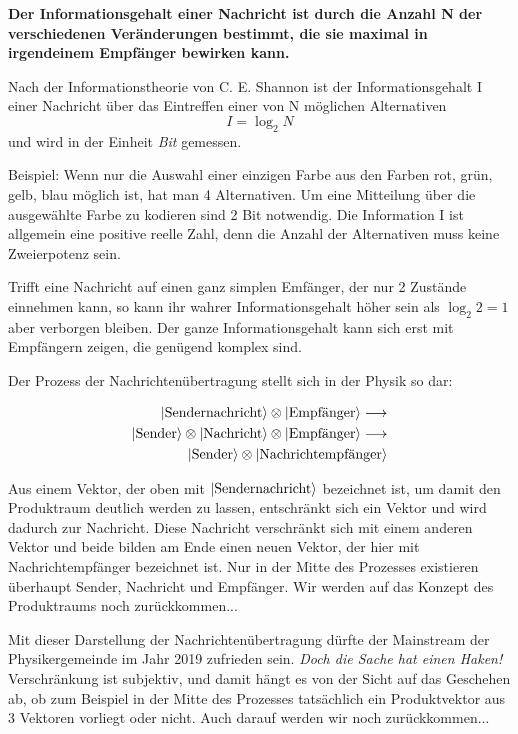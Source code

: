 \documentclass[12pt]{book}
\begin{document}
\textbf{Der Informationsgehalt einer Nachricht ist durch die Anzahl N der verschiedenen Veränderungen bestimmt, die sie maximal in irgendeinem Empfänger bewirken kann.} 

Nach der Informationstheorie von C. E. Shannon ist der Informationsgehalt I einer Nachricht über das Eintreffen einer von N möglichen Alternativen
\begin{equation} 
I = \log_2 N 
\end{equation}
und wird in der Einheit \emph{Bit} gemessen.

Beispiel: Wenn nur die Auswahl einer einzigen Farbe aus den Farben {rot, grün, gelb, blau} möglich ist, hat man 4 Alternativen. Um eine Mitteilung über die ausgewählte Farbe zu kodieren sind 2 Bit notwendig. Die Information I ist allgemein eine positive reelle Zahl, denn die Anzahl der Alternativen muss keine Zweierpotenz sein.

Trifft eine Nachricht auf einen ganz simplen Emfänger, der nur 2 Zustände einnehmen kann, so kann ihr wahrer Informationsgehalt höher sein als $\log_2 2 = 1$ aber verborgen bleiben. Der ganze Informationsgehalt kann sich erst mit Empfängern zeigen, die genügend komplex sind.

Der Prozess der Nachrichtenübertragung stellt sich in der Physik so dar:

\begin{equation} 
\begin{split}
\ket{\text{Sendernachricht}} \otimes \ket{\text{Empfänger}} \longrightarrow \\
\ket{\text{Sender}} \otimes \ket{\text{Nachricht}} \otimes \ket{\text{Empfänger}} \longrightarrow \\
\ket{\text{Sender}} \otimes \ket{\text{Nachrichtempfänger}} 
\label{eq:messaging_qm}
\end{split}
\end{equation}

Aus einem Vektor, der oben mit $\ket{\text{Sendernachricht}}$ bezeichnet ist, um damit den Produktraum deutlich werden zu lassen, entschränkt sich ein Vektor und wird dadurch zur Nachricht. Diese Nachricht verschränkt sich mit einem anderen Vektor und beide bilden am Ende einen neuen Vektor, der hier mit Nachrichtempfänger bezeichnet ist. Nur in der Mitte des Prozesses existieren überhaupt Sender, Nachricht und Empfänger. Wir werden auf das Konzept des Produktraums noch zurückkommen...

Mit dieser Darstellung der Nachrichtenübertragung dürfte der Mainstream der Physikergemeinde im Jahr 2019 zufrieden sein. \emph{Doch die Sache hat einen Haken!} Verschränkung ist subjektiv, und damit hängt es von der Sicht auf das Geschehen ab, ob zum Beispiel in der Mitte des Prozesses tatsächlich ein Produktvektor aus 3 Vektoren vorliegt oder nicht. Auch darauf werden wir noch zurückkommen...
\end{document}
